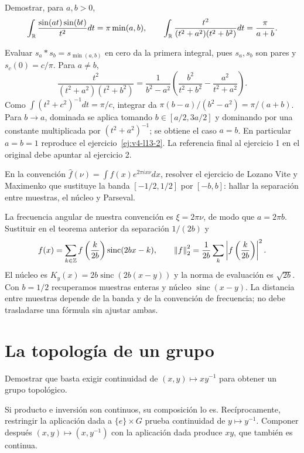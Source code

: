 \begin{ejercicio}\label{ej:v4-l13-4}
Demostrar, para $a,b>0$,
\[
 \int_\mathbb R\frac{\sin(at)\sin(bt)}{t^2}dt=\pi\min(a,b),\qquad
 \int_\mathbb R\frac{t^2}{(t^2+a^2)(t^2+b^2)}dt=\frac\pi{a+b}.
\]
\end{ejercicio}
\begin{solucion}
Evaluar $s_a*s_b=s_{\min(a,b)}$ en cero da la primera integral, pues $s_a,s_b$ son pares y $s_c(0)=c/\pi$. Para $a\ne b$,
\[
 \frac{t^2}{(t^2+a^2)(t^2+b^2)}
 =\frac1{b^2-a^2}\left(\frac{b^2}{t^2+b^2}-\frac{a^2}{t^2+a^2}\right).
\]
Como $\int(t^2+c^2)^{-1}dt=\pi/c$, integrar da $\pi(b-a)/(b^2-a^2)=\pi/(a+b)$. Para $b\to a$, dominada se aplica tomando $b\in[a/2,3a/2]$ y dominando por una constante multiplicada por $(t^2+a^2)^{-1}$; se obtiene el caso $a=b$. En particular $a=b=1$ reproduce el ejercicio~\ref{ej:v4-l13-2}. La referencia final al ejercicio 1 en el original debe apuntar al ejercicio 2.
\end{solucion}

\begin{ejercicio}\label{ej:v4-ampl-muestreo}
En la convención $\widehat f(\nu)=\int f(x)e^{2\pi ix\nu}dx$, resolver el ejercicio de Lozano Vite y Maximenko que sustituye la banda $[-1/2,1/2]$ por $[-b,b]$: hallar la separación entre muestras, el núcleo y Parseval.
\end{ejercicio}
\begin{solucion}
La frecuencia angular de nuestra convención es $\xi=2\pi\nu$, de modo que $a=2\pi b$. Sustituir en el teorema anterior da separación $1/(2b)$ y
\[
 f(x)=\sum_{k\in\mathbb Z}f\left(\frac{k}{2b}\right)\operatorname{sinc}(2bx-k),\qquad
 \left\lVert f\right\rVert_2^2=\frac1{2b}\sum_k\left|f\left(\frac{k}{2b}\right)\right|^2.
\]
El núcleo es $K_y(x)=2b\operatorname{sinc}(2b(x-y))$ y la norma de evaluación es $\sqrt{2b}$. Con $b=1/2$ recuperamos muestras enteras y núcleo $\operatorname{sinc}(x-y)$. La distancia entre muestras depende de la banda y de la convención de frecuencia; no debe trasladarse una fórmula sin ajustar ambas.
\end{solucion}

\chapter{La topología de un grupo}

\begin{ejercicio}\label{ej:v4-l15-1}
Demostrar que basta exigir continuidad de $(x,y)\mapsto xy^{-1}$ para obtener un grupo topológico.
\end{ejercicio}
\begin{solucion}
Si producto e inversión son continuos, su composición lo es. Recíprocamente, restringir la aplicación dada a $\{e\}\times G$ prueba continuidad de $y\mapsto y^{-1}$. Componer después $(x,y)\mapsto(x,y^{-1})$ con la aplicación dada produce $xy$, que también es continua.
\end{solucion}


